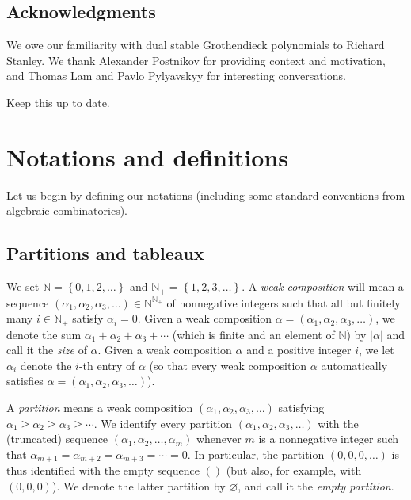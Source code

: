 \documentclass[numbers=enddot,12pt,final,onecolumn,notitlepage]{scrartcl}%
\theoremstyle{definition}
\newenvironment{todo}{}{}
\begin{document}
\subsection{Acknowledgments}

We owe our familiarity with dual stable Grothendieck polynomials to Richard
Stanley. We thank Alexander Postnikov for providing context and motivation,
and Thomas Lam and Pavlo Pylyavskyy for interesting conversations.

\begin{todo}
Keep this up to date.
\end{todo}

\section{\label{sect.notations}Notations and definitions}

Let us begin by defining our notations (including some standard conventions
from algebraic combinatorics).

\subsection{Partitions and tableaux}

We set $\mathbb{N}=\left\{  0,1,2,\ldots\right\}  $ and $\mathbb{N}%
_{+}=\left\{  1,2,3,\ldots\right\}  $. A \textit{weak composition} will mean a
sequence $\left(  \alpha_{1},\alpha_{2},\alpha_{3},\ldots\right)
\in\mathbb{N}^{\mathbb{N}_{+}}$ of nonnegative integers such that all but
finitely many $i\in\mathbb{N}_{+}$ satisfy $\alpha_{i}=0$. Given a weak
composition $\alpha=\left(  \alpha_{1},\alpha_{2},\alpha_{3},\ldots\right)  $,
we denote the sum $\alpha_{1}+\alpha_{2}+\alpha_{3}+\cdots$ (which is finite
and an element of $\mathbb{N}$) by $\left\vert \alpha\right\vert $ and call it
the \textit{size} of $\alpha$. Given a weak composition $\alpha$ and a
positive integer $i$, we let $\alpha_{i}$ denote the $i$-th entry of $\alpha$
(so that every weak composition $\alpha$ automatically satisfies
$\alpha=\left(  \alpha_{1},\alpha_{2},\alpha_{3},\ldots\right)  $).

A \textit{partition} means a weak composition $\left(  \alpha_{1},\alpha
_{2},\alpha_{3},\ldots\right)  $ satisfying $\alpha_{1}\geq\alpha_{2}%
\geq\alpha_{3}\geq\cdots$. We identify every partition $\left(  \alpha
_{1},\alpha_{2},\alpha_{3},\ldots\right)  $ with the (truncated) sequence
$\left(  \alpha_{1},\alpha_{2},\ldots,\alpha_{m}\right)  $ whenever $m$ is a
nonnegative integer such that $\alpha_{m+1}=\alpha_{m+2}=\alpha_{m+3}%
=\cdots=0$. In particular, the partition $\left(  0,0,0,\ldots\right)  $ is
thus identified with the empty sequence $\left(  {}\right)  $ (but also, for
example, with $\left(  0,0,0\right)  $). We denote the latter partition by
$\varnothing$, and call it the \textit{empty partition}.
\end{document}
